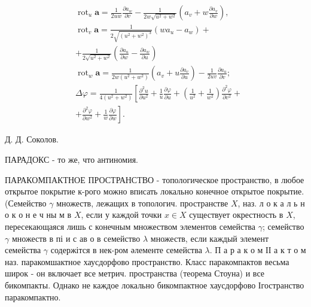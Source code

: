 \documentclass[10pt]{article}
\begin{document}
\[
\begin{aligned}
& \operatorname{rot}_{u} \boldsymbol{a}=\frac{1}{2 u w} \frac{\partial a_{w}}{\partial v}-\frac{1}{2 w \sqrt{u^{2}+w^{2}}}\left(a_{v}+w \frac{\partial a_{v}}{\partial w}\right), \\
& \operatorname{rot}_{v} \boldsymbol{a}=\frac{1}{2 \sqrt{\left(u^{2}+w^{2}\right)^{3}}}\left(w a_{u}-a_{w}\right)+ \\
& +\frac{1}{2 \sqrt{u^{2}+w^{2}}}\left(\frac{\partial a_{u}}{\partial w}-\frac{\partial a_{w}}{\partial u}\right) \\
& \operatorname{rot}_{w} \boldsymbol{a}=\frac{1}{2 w\left(u^{2}+w^{2}\right)}\left(a_{v}+u \frac{\partial a_{v}}{\partial u}\right)-\frac{1}{2 u v} \frac{\partial a_{u}}{\partial v} ; \\
& \Delta \varphi=\frac{1}{4\left(u^{2}+w^{2}\right)}\left[\frac{\partial^{2} u}{\partial u^{2}}+\frac{1}{u} \frac{\partial \varphi}{\partial u}+\left(\frac{1}{u^{2}}+\frac{1}{w^{2}}\right) \frac{\partial^{2} \varphi}{\partial v^{2}}+\right. \\
& \left.+\frac{\partial^{2} \varphi}{\partial w^{2}}+\frac{1}{w} \frac{\partial \varphi}{\partial w}\right] \text {. }
\end{aligned}
\]

Д. Д. Соколов.

ПАРАДОКС - то же, что антиномия.

ПАРАКОМПАКТНОЕ ПРОСТРАНСТВО - топологическое пространство, в любое открытое покрытие к-рого можно вписать локально конечное открытое покрытие. (Семейство $\gamma$ множеств, лежащих в топологич. пространстве $X$, наз. л о к а л ь н о к о н е ч ны м в $X$, если у каждой точки $x \in X$ существует окрестность в $X$, пересекающаяся лишь с конечным множеством элементов семейства $\gamma$; семейство $\gamma$ множеств в пі и с ав о в семейство $\lambda$ множеств, если каждый элемент семейства $\gamma$ содержітся в нек-ром әлементе семейства $\lambda$. П а р а к о м ІІ а к т о м наз. паракомшактное хаусдорфово пространство. Класс паракомпактов весьма широк - он включает все метрич. пространства (теорема Стоуна) и все бикомпакты. Однако не каждое локально бикомпактное хаусдорфово Ігостранство паракомпактно.
\end{document}
